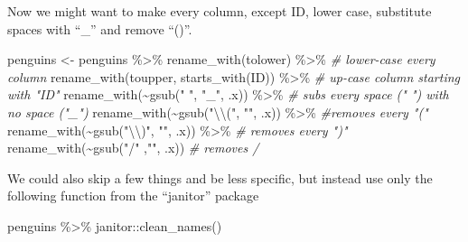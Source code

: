 \documentclass[
]{book}
\newenvironment{Shaded}{\begin{snugshade}}{\end{snugshade}}
\newcommand{\CommentTok}[1]{\textcolor[rgb]{0.56,0.35,0.01}{\textit{#1}}}
\newcommand{\FunctionTok}[1]{\textcolor[rgb]{0.00,0.00,0.00}{#1}}
\newcommand{\NormalTok}[1]{#1}
\newcommand{\OtherTok}[1]{\textcolor[rgb]{0.56,0.35,0.01}{#1}}
\newcommand{\SpecialCharTok}[1]{\textcolor[rgb]{0.00,0.00,0.00}{#1}}
\newcommand{\StringTok}[1]{\textcolor[rgb]{0.31,0.60,0.02}{#1}}
\begin{document}
Now we might want to make every column, except ID, lower case, substitute spaces with ``\_'' and remove ``()''.

\begin{Shaded}
\begin{Highlighting}[]
\NormalTok{penguins }\OtherTok{\textless{}{-}}\NormalTok{ penguins }\SpecialCharTok{\%\textgreater{}\%} 
  \FunctionTok{rename\_with}\NormalTok{(tolower) }\SpecialCharTok{\%\textgreater{}\%}  \CommentTok{\# lower{-}case every column}
  \FunctionTok{rename\_with}\NormalTok{(toupper, }\FunctionTok{starts\_with}\NormalTok{(}\StringTok{\textquotesingle{}ID\textquotesingle{}}\NormalTok{)) }\SpecialCharTok{\%\textgreater{}\%} \CommentTok{\# up{-}case column starting with "ID"}
  \FunctionTok{rename\_with}\NormalTok{(}\SpecialCharTok{\textasciitilde{}}\FunctionTok{gsub}\NormalTok{(}\StringTok{" "}\NormalTok{, }\StringTok{"\_"}\NormalTok{, .x))  }\SpecialCharTok{\%\textgreater{}\%} \CommentTok{\# subs every space (" ") with no space ("\_")}
  \FunctionTok{rename\_with}\NormalTok{(}\SpecialCharTok{\textasciitilde{}}\FunctionTok{gsub}\NormalTok{(}\StringTok{"}\SpecialCharTok{\textbackslash{}\textbackslash{}}\StringTok{("}\NormalTok{, }\StringTok{""}\NormalTok{, .x)) }\SpecialCharTok{\%\textgreater{}\%}  \CommentTok{\#removes every "("}
  \FunctionTok{rename\_with}\NormalTok{(}\SpecialCharTok{\textasciitilde{}}\FunctionTok{gsub}\NormalTok{(}\StringTok{"}\SpecialCharTok{\textbackslash{}\textbackslash{}}\StringTok{)"}\NormalTok{, }\StringTok{""}\NormalTok{, .x))  }\SpecialCharTok{\%\textgreater{}\%} \CommentTok{\# removes every ")"}
  \FunctionTok{rename\_with}\NormalTok{(}\SpecialCharTok{\textasciitilde{}}\FunctionTok{gsub}\NormalTok{(}\StringTok{"/"}\NormalTok{ ,}\StringTok{""}\NormalTok{, .x))  }\CommentTok{\# removes /}
\end{Highlighting}
\end{Shaded}

We could also skip a few things and be less specific, but instead use only the following function from the ``janitor'' package

\begin{Shaded}
\begin{Highlighting}[]
\NormalTok{penguins }\SpecialCharTok{\%\textgreater{}\%} 
\NormalTok{  janitor}\SpecialCharTok{::}\FunctionTok{clean\_names}\NormalTok{()}
\end{Highlighting}
\end{Shaded}
\end{document}
